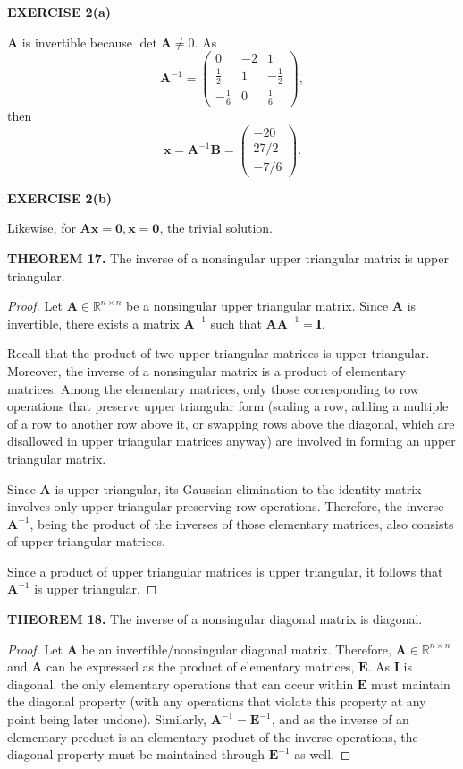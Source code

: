 \documentclass[12pt]{article}
\newcommand{\mat}[1]{\mathbf{#1}}
\newcommand{\exercise}[1]{\textbf{EXERCISE #1}\label{#1}}
\newcommand{\theorem}[2]{\textbf{THEOREM #1.} #2}
\begin{document}
\exercise{2(a)}

$\mat{A}$ is invertible because $\det \mat{A} \neq 0$. As
$$\mat{A}^{-1} = 
\begin{pmatrix} 
  0 & -2 & 1 \\
  \frac{1}{2} & 1 & -\frac{1}{2} \\
  -\frac{1}{6} & 0 & \frac{1}{6}
\end{pmatrix},$$
then
$$\mat{x} = \mat{A}^{-1}\mat{B} =
\begin{pmatrix}
-20 \\ 27/2 \\ -7/6
\end{pmatrix}.$$

\exercise{2(b)}

Likewise, for $\mat{Ax} = \mat{0}, \mat{x} = \mat{0}$, the trivial solution.

\theorem{17}{The inverse of a nonsingular upper triangular matrix is upper triangular.}

\begin{proof}
Let $\mat{A} \in \mathbb{R}^{n \times n}$ be a nonsingular upper triangular matrix. Since $\mat{A}$ is invertible, there exists a matrix $\mat{A}^{-1}$ such that $\mat{A} \mat{A}^{-1} = \mat{I}$.

Recall that the product of two upper triangular matrices is upper triangular. Moreover, the inverse of a nonsingular matrix is a product of elementary matrices. Among the elementary matrices, only those corresponding to row operations that preserve upper triangular form (scaling a row, adding a multiple of a row to another row above it, or swapping rows above the diagonal, which are disallowed in upper triangular matrices anyway) are involved in forming an upper triangular matrix.

Since $\mat{A}$ is upper triangular, its Gaussian elimination to the identity matrix involves only upper triangular-preserving row operations. Therefore, the inverse $\mat{A}^{-1}$, being the product of the inverses of those elementary matrices, also consists of upper triangular matrices.

Since a product of upper triangular matrices is upper triangular, it follows that $\mat{A}^{-1}$ is upper triangular.
\end{proof}

\theorem{18}{The inverse of a nonsingular diagonal matrix is diagonal.}

\begin{proof}
Let $\mat{A}$ be an invertible/nonsingular diagonal matrix. Therefore, $\mat{A} \in \mathbb{R}^{n \times n}$ and $\mat{A}$ can be expressed as the product of elementary matrices, $\mat{E}$. As $\mat{I}$ is diagonal, the only elementary operations that can occur within $\mat{E}$ must maintain the diagonal property (with any operations that violate this property at any point being later undone). Similarly, $\mat{A}^{-1} = \mat{E}^{-1}$, and as the inverse of an elementary product is an elementary product of the inverse operations, the diagonal property must be maintained through $\mat{E}^{-1}$ as well.   
\end{proof}
\end{document}
